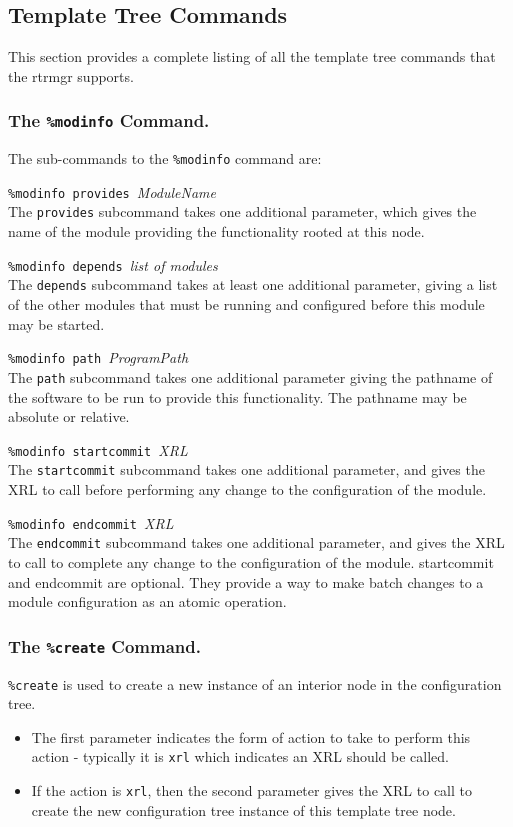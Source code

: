 \documentclass[11pt]{article}
\begin{document}
\subsection{Template Tree Commands}
This section provides a complete listing of all the template tree
commands that the rtrmgr supports.
\subsubsection{The {\tt \%modinfo} Command.}
The sub-commands to the {\tt \%modinfo} command are:
\begin{description}
\item {{\tt \%modinfo provides }{\it ModuleName}}  \\The {\tt provides} subcommand takes one additional
parameter, which gives the name of the module providing the
functionality rooted at this node.  
\item {{\tt \%modinfo depends }{\it list of modules}}  \\The {\tt depends} subcommand takes at least one additional
parameter, giving a list of the other modules that must
be running and configured before this module may be started.
\item {{\tt \%modinfo path }{\it ProgramPath}}  \\The {\tt path} subcommand takes one additional parameter giving the pathname of the software to be run
to provide this functionality.  The pathname may be absolute or
relative.
\item {{\tt \%modinfo startcommit }{\it XRL}}  \\The {\tt startcommit} subcommand takes one additional
parameter, and gives the XRL to call before performing
any change to the configuration of the module.
\item {{\tt \%modinfo endcommit }{\it XRL}}  \\The {\tt endcommit} subcommand takes one additional
parameter, and gives the XRL to call to complete any
change to the configuration of the module.  startcommit and
endcommit are optional.  They provide a way to make batch changes to a
module configuration as an atomic operation.
\end{description}
\subsubsection{The {\tt \%create} Command.}
{\tt \%create} is used to create a new instance of an interior node in
the configuration tree.  
\begin{itemize}
\item The first parameter indicates the form of
action to take to perform this action - typically it is {\tt xrl}
which indicates an XRL should be called.  
\item If the action is {\tt xrl}, then the second parameter gives the XRL to
call to create the new configuration tree instance of this template
tree node.
\end{itemize}
\end{document}
